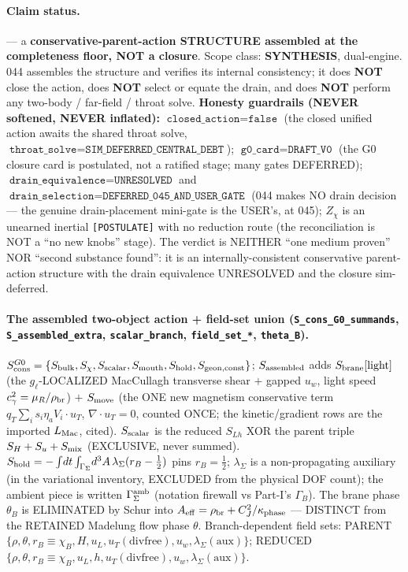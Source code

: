\paragraph{Claim status.}
\StatusOpen{} --- a \textbf{conservative-parent-action STRUCTURE assembled at the
completeness floor, NOT a closure}. Scope class: \textbf{SYNTHESIS}, dual-engine.
044 assembles the structure and verifies its internal consistency; it does \textbf{NOT}
close the action, does \textbf{NOT} select or equate the drain, and does \textbf{NOT}
perform any two-body / far-field / throat solve. \textbf{Honesty guardrails (NEVER
softened, NEVER inflated):} \(\texttt{closed\_action}=\texttt{false}\) (the closed
unified action awaits the shared throat solve,
\(\texttt{throat\_solve}=\texttt{SIM\_DEFERRED\_CENTRAL\_DEBT}\));
\(\texttt{g0\_card}=\texttt{DRAFT\_V0}\) (the G0 closure card is postulated, not a
ratified stage; many gates DEFERRED); \(\texttt{drain\_equivalence}=\texttt{UNRESOLVED}\)
and \(\texttt{drain\_selection}=\texttt{DEFERRED\_045\_AND\_USER\_GATE}\) (044 makes NO
drain decision --- the genuine drain-placement mini-gate is the USER's, at 045);
\(Z_\chi\) is an unearned inertial \texttt{[POSTULATE]} with no reduction route (the
reconciliation is NOT a ``no new knobs'' stage). The verdict is NEITHER ``one medium
proven'' NOR ``second substance found'': it is an internally-consistent conservative
parent-action structure with the drain equivalence UNRESOLVED and the closure
sim-deferred.

\paragraph{The assembled two-object action + field-set union (\texttt{S\_cons\_G0\_summands}, \texttt{S\_assembled\_extra}, \texttt{scalar\_branch}, \texttt{field\_set\_*}, \texttt{theta\_B}).}
\(S_{\rm cons}^{G0}=\{S_{\rm bulk},S_\chi,S_{\rm scalar},S_{\rm mouth},S_{\rm
hold},S_{\rm geon,const}\}\); \(S_{\rm assembled}\) adds \(S_{\rm brane}[\text{light}]\)
(the \(g_\ell\)-LOCALIZED MacCullagh transverse shear \(+\) gapped \(u_w\), light speed
\(c_\gamma^2=\mu_R/\rho_{\rm br}\)) \(+\) \(S_{\rm move}\) (the ONE new magnetism
conservative term \(q_T\sum_i s_i\eta_a V_i\!\cdot\!u_T\), \(\nabla\!\cdot\!u_T=0\),
counted ONCE; the kinetic/gradient rows are the imported \(L_{\rm Mac}\), cited).
\(S_{\rm scalar}\) is the reduced \(S_{Lh}\) XOR the parent triple
\(S_H+S_u+S_{\rm mix}\) (EXCLUSIVE, never summed). \(S_{\rm hold}=-\int\!dt\int_{\Gamma_\Sigma}\!d^3A\,\lambda_\Sigma(r_B-\tfrac12)\)
pins \(r_B=\tfrac12\); \(\lambda_\Sigma\) is a non-propagating auxiliary (in the
variational inventory, EXCLUDED from the physical DOF count); the ambient piece is
written \(\Gamma_\Sigma^{\rm amb}\) (notation firewall vs Part-I's \(\Gamma_B\)). The
brane phase \(\theta_B\) is ELIMINATED by Schur into \(A_{\rm
eff}=\rho_{\rm br}+C_J^2/\kappa_{\rm phase}\) --- DISTINCT from the RETAINED Madelung
flow phase \(\theta\). Branch-dependent field sets: PARENT \(\{\rho,\theta,r_B\equiv
\chi_B,H,u_L,u_T(\text{divfree}),u_w,\lambda_\Sigma(\text{aux})\}\); REDUCED
\(\{\rho,\theta,r_B\equiv\chi_B,u_L,h,u_T(\text{divfree}),u_w,\lambda_\Sigma(\text{aux})\}\).

